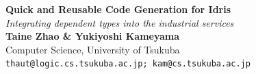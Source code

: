 \documentclass[a1,portrait]{a1poster}
\begin{document}
% 


\begin{minipage}[b]{0.6\linewidth}
\huge \color{DarkRed} \textbf{Quick and Reusable Code Generation for Idris} \color{Black}\\ %
\huge\textit{Integrating dependent types into the industrial services}\\[1cm] %
\large \textbf{Taine Zhao \& Yukiyoshi Kameyama}\\[0.5cm] %
\large Computer Science, University of Tsukuba \\[0.2cm] %
\texttt{thaut@logic.cs.tsukuba.ac.jp; kam@cs.tsukuba.ac.jp}\\
\end{minipage}
%
\vspace{.5cm} %

\end{document}
